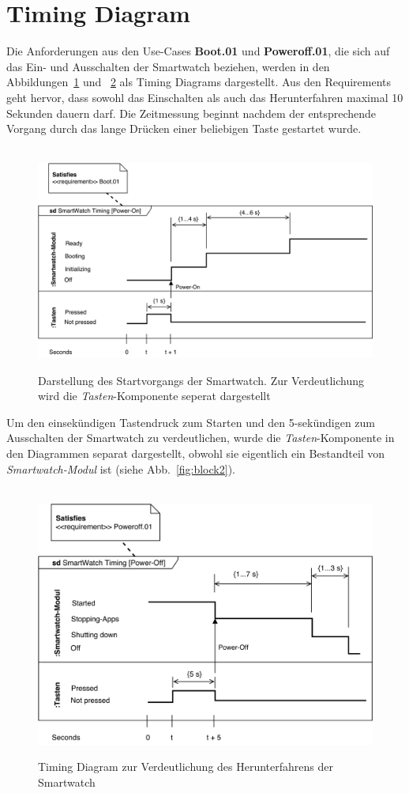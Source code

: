 \section{Timing Diagram}
Die Anforderungen aus den \glspl{Use-Case} \textbf{Boot.01} und \textbf{Poweroff.01}, die sich auf das Ein- und Ausschalten der Smartwatch beziehen, werden in den Abbildungen~\ref{fig:timing_diagram_power_on} und ~\ref{fig:timing_diagram_power_off} als Timing Diagrams dargestellt. Aus den \glspl{Requirement} geht hervor, dass sowohl das Einschalten als auch das Herunterfahren maximal 10 Sekunden dauern darf. Die Zeitmessung beginnt nachdem der entsprechende Vorgang durch das lange Drücken einer beliebigen Taste gestartet wurde.

\begin{figure}
\centering\
\includegraphics[width=14cm]{img/timing_diagram_power_on}
\caption[Timing Diagram: Power-On]{Darstellung des Startvorgangs der Smartwatch. Zur Verdeutlichung wird die \textit{Tasten}-Komponente seperat dargestellt}
\label{fig:timing_diagram_power_on}
\end{figure}

Um den einsekündigen Tastendruck zum Starten und den 5-sekündigen zum Ausschalten der Smartwatch zu verdeutlichen, wurde die \textit{Tasten}-Komponente in den Diagrammen separat dargestellt, obwohl sie eigentlich ein Bestandteil von \textit{Smartwatch-Modul} ist (siehe Abb.~\ref{fig:block2}).

\begin{figure}
\centering\
\includegraphics[width=14cm]{img/timing_diagram_power_off}
\caption[Timing Diagram: Power-Off]{Timing Diagram zur Verdeutlichung des Herunterfahrens der Smartwatch}
\label{fig:timing_diagram_power_off}
\end{figure}
